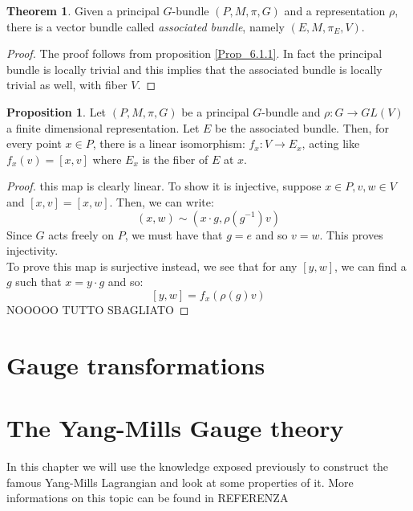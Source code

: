 \documentclass[12pt,a4paper]{report}
\theoremstyle{definition}
\theoremstyle{Theorem}
\newtheorem{Theo}[Def]{Theorem}
\newtheorem{Prop}[Def]{Proposition}
\theoremstyle{definition}
\theoremstyle{definition}
\begin{document}
	\begin{Theo}
		Given a principal $G$-bundle $(P,M,\pi,G)$ and a representation $\rho$, there is a vector bundle called \textit{associated bundle}, namely $(E,M,\pi_E,V)$.
	\end{Theo}
	\begin{proof}
		The proof follows from proposition \ref{Prop_6.1.1}. In fact the principal bundle is locally trivial and this implies that the associated bundle is locally trivial as well, with fiber $V$.
	\end{proof}
	\begin{Prop}
		Let $(P,M,\pi,G)$ be a principal $G$-bundle and $\rho:G\rightarrow GL(V)$ a finite dimensional representation. Let $E$ be the associated bundle. Then, for every point $x\in P$, there is a linear isomorphism:
		$f_x:V\rightarrow E_x$, acting like $f_x(v)=[x,v]$ where $E_x$ is the fiber of $E$ at $x$.
	\end{Prop}
	\begin{proof}
		this map is clearly linear. To show it is injective, suppose $x\in P,v,w\in V$ and $[x,v]=[x,w]$. Then, we can write:
		$$(x,w)\sim(x\cdot g,\rho(g^{-1})v)$$
		Since $G$ acts freely on $P$, we must have that $g=e$ and so $v=w$. This proves injectivity.\\
		To prove this map is surjective instead, we see that for any $[y,w]$, we can find a $g$ such that $x=y\cdot g$ and so:
		$$[y,w]=f_x(\rho(g)v)$$ NOOOOO TUTTO SBAGLIATO
	\end{proof}
	\chapter{Gauge transformations}
	\chapter{The Yang-Mills Gauge theory}
	In this chapter we will use the knowledge exposed previously to construct the famous Yang-Mills Lagrangian and look at some properties of it. More informations on this topic can be found in REFERENZA
\end{document}
